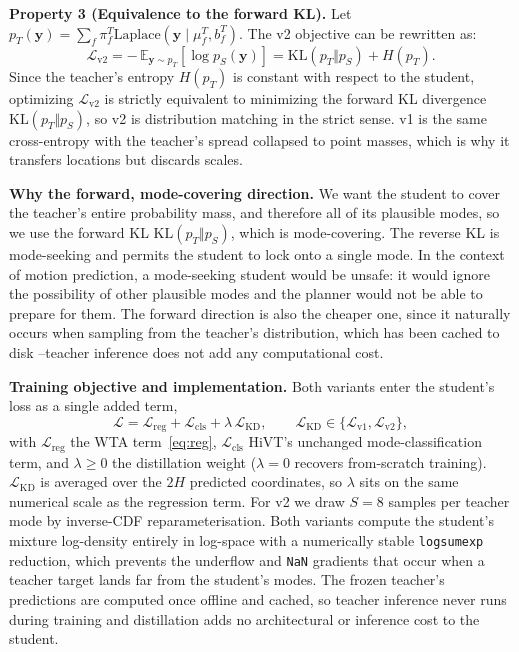 \documentclass[conference]{IEEEtran}
\newcommand{\Lap}{\mathrm{Laplace}}
\newcommand{\loc}{\mu}
\newcommand{\scale}{b}
\newcommand{\KL}{\mathrm{KL}}
\newcommand{\E}{\mathbb{E}}
\begin{document}
\textbf{Property 3 (Equivalence to the forward KL).} 
Let $p_T(\mathbf{y})=\sum_f\pi^T_f\Lap(\mathbf{y}\mid\loc^T_f,\scale^T_f)$. The v2 objective can be rewritten as:
\begin{equation}
  \label{eq:kl}
  \mathcal{L}_{\mathrm{v2}}
   = -\,\E_{\mathbf{y}\sim p_T}\!\left[\log p_S(\mathbf{y})\right]
   = \KL\!\left(p_T\Vert p_S\right) + H(p_T).
\end{equation}
Since the teacher's entropy $H(p_T)$ is constant with respect to the student, optimizing $\mathcal{L}_{\mathrm{v2}}$ 
is strictly equivalent to minimizing the forward KL divergence $\KL(p_T\Vert p_S)$, 
so v2 is distribution matching in the
strict sense. v1 is the same cross-entropy with the teacher's spread collapsed to
point masses, which is why it transfers locations but discards scales.

\textbf{Why the forward, mode-covering direction.}  We want the student to cover
the teacher's entire probability mass, and therefore all of its plausible modes,
so we use the forward KL $\KL(p_T\Vert p_S)$, which is mode-covering. The reverse
KL is mode-seeking and permits the student to lock onto a single mode. 
In the context of motion prediction, a mode-seeking student would be unsafe: it would ignore the 
possibility of other plausible modes and the planner would not be 
able to prepare for them. The forward direction is also the cheaper one, since it naturally
occurs when sampling from the teacher's distribution, which has been cached to disk --teacher inference does not add any computational cost. 

\textbf{Training objective and implementation.} Both variants enter the student's
loss as a single added term,
\begin{equation}
  \label{eq:total}
  \mathcal{L} = \mathcal{L}_{\mathrm{reg}} + \mathcal{L}_{\mathrm{cls}}
    + \lambda\,\mathcal{L}_{\mathrm{KD}},
  \qquad
  \mathcal{L}_{\mathrm{KD}}\in\{\mathcal{L}_{\mathrm{v1}},\mathcal{L}_{\mathrm{v2}}\},
\end{equation}
with $\mathcal{L}_{\mathrm{reg}}$ the WTA term~\eqref{eq:reg},
$\mathcal{L}_{\mathrm{cls}}$ HiVT's unchanged mode-classification term, and
$\lambda\ge0$ the distillation weight ($\lambda{=}0$ recovers from-scratch
training). $\mathcal{L}_{\mathrm{KD}}$ is averaged over the $2H$ predicted
coordinates, so $\lambda$ sits on the same numerical scale as the regression term.
For v2 we draw $S{=}8$ samples per teacher mode by inverse-CDF reparameterisation.
Both variants compute the student's mixture log-density entirely in log-space with a
numerically stable \texttt{logsumexp} reduction, which prevents the underflow and
\texttt{NaN} gradients that occur when a teacher target lands far from the student's
modes. The frozen teacher's predictions are computed once offline and cached, so
teacher inference never runs during training and distillation adds no architectural
or inference cost to the student. 
\end{document}
